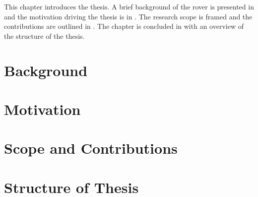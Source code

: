 This chapter introduces the thesis. A brief background of the rover is presented in  and the motivation driving the thesis is in . The research scope is framed and the contributions are outlined in . The chapter is concluded in  with an overview of the structure of the thesis.

\section{Background}
\label{sec:Introduction:Background}


\section{Motivation}
\label{sec:Introduction:Motivation}


\section{Scope and Contributions}
\label{sec:Introduction:ScopeAndContributions}


\section{Structure of Thesis}
\label{sec:Introduction:StructureOfThesis}


